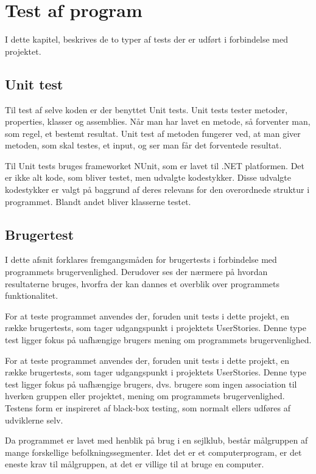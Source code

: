 \chapter{Test af program}\label{test_af_program}
I dette kapitel, beskrives de to typer af tests der er udført i forbindelse med projektet.

\section{Unit test}
Til test af selve koden er der benyttet Unit tests.
Unit tests tester metoder, properties, klasser og assemblies. 
Når man har lavet en metode, så forventer man, som regel, et bestemt resultat.
Unit test af metoden fungerer ved, at man giver metoden, som skal testes, et input, og ser man får det forventede resultat.

Til Unit tests bruges frameworket NUnit, som er lavet til .NET platformen. 
Det er ikke alt kode, som bliver testet, men udvalgte kodestykker.
Disse udvalgte kodestykker er valgt på baggrund af deres relevans for den overordnede struktur i programmet. 
Blandt andet bliver klasserne testet.

\section{Brugertest}
I dette afsnit forklares fremgangsmåden for brugertests i forbindelse med programmets brugervenlighed.
Derudover ses der nærmere på hvordan resultaterne bruges, hvorfra der kan dannes et overblik over programmets funktionalitet. 

For at teste programmet anvendes der, foruden unit tests i dette projekt, en række brugertests, som tager udgangspunkt i projektets UserStories.
Denne type test ligger fokus på uafhængige brugers mening om programmets brugervenlighed.

For at teste programmet anvendes der, foruden unit tests i dette projekt, en række brugertests, som tager udgangspunkt i projektets UserStories. 
Denne type test ligger fokus på uafhængige brugers, dvs. brugere som ingen association til hverken gruppen eller projektet, mening om programmets brugervenlighed.
Testens form er inspireret af black-box testing, som normalt ellers udføres af udviklerne selv.

Da programmet er lavet med henblik på brug i en sejlklub, består målgruppen af mange forskellige befolkningssegmenter. 
Idet det er et computerprogram, er det eneste krav til målgruppen, at det er villige til at bruge en computer.

